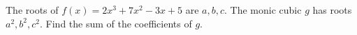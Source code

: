 The roots of $f(x)=2x^3+7x^2-3x+5$ are $a,b,c$. The monic cubic $g$ has roots $a^2,b^2,c^2$. Find the sum of the coefficients of $g$.
